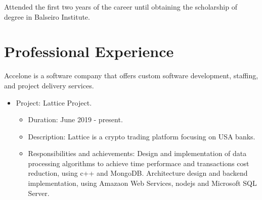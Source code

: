 \documentclass[11pt,a4paper,sans]{moderncv}        %
\begin{document}
{Attended the first two years of the career until obtaining the scholarship of degree in Balseiro Institute.}




\section{Professional Experience}

{Accelone is a software company that offers custom software development, staffing, and project delivery services.
\begin{itemize}
\item Project: Lattice Project.
	\begin{itemize}%
	\item Duration: June 2019 - present.
	\item Description: Lattice is a crypto trading platform focusing on USA banks.
	\item Responsibilities and achievements: Design and implementation of data processing algorithms to achieve time performace and transactions cost reduction,
	using c++ and MongoDB. Architecture design and backend implementation, using Amazaon Web Services, nodejs and Microsoft SQL Server.
	\end{itemize}
\end{itemize}
}
\end{document}
